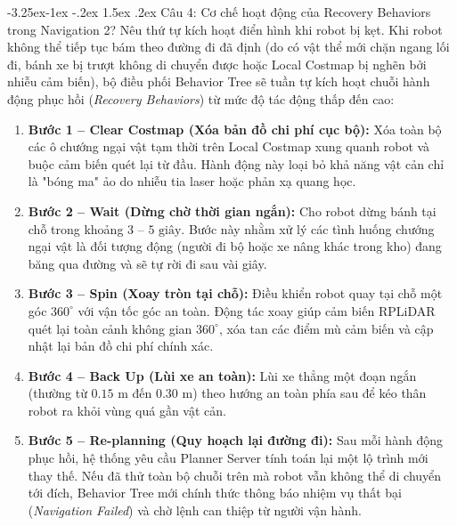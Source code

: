 \documentclass[11pt,a4paper]{article}
\makeatletter
\renewcommand{\subsection}{\@startsection{subsection}{2}{\z@}%
  {-3.25ex\@plus -1ex \@minus -.2ex}%
  {1.5ex \@plus .2ex}%
  {\normalfont\large\bfseries\color{secondary}}}
\makeatother
\begin{document}
\subsection{Câu 4: Cơ chế hoạt động của Recovery Behaviors trong Navigation 2? Nêu thứ tự kích hoạt điển hình khi robot bị kẹt.}
Khi robot không thể tiếp tục bám theo đường đi đã định (do có vật thể mới chặn ngang lối đi, bánh xe bị trượt không di chuyển được hoặc Local Costmap bị nghẽn bởi nhiễu cảm biến), bộ điều phối Behavior Tree sẽ tuần tự kích hoạt chuỗi hành động phục hồi (\textit{Recovery Behaviors}) từ mức độ tác động thấp đến cao:
\begin{enumerate}
  \item \textbf{Bước 1 -- Clear Costmap (Xóa bản đồ chi phí cục bộ):} Xóa toàn bộ các ô chướng ngại vật tạm thời trên Local Costmap xung quanh robot và buộc cảm biến quét lại từ đầu. Hành động này loại bỏ khả năng vật cản chỉ là "bóng ma" ảo do nhiễu tia laser hoặc phản xạ quang học.
  \item \textbf{Bước 2 -- Wait (Dừng chờ thời gian ngắn):} Cho robot dừng bánh tại chỗ trong khoảng $3\text{ -- }5\text{ giây}$. Bước này nhằm xử lý các tình huống chướng ngại vật là đối tượng động (người đi bộ hoặc xe nâng khác trong kho) đang băng qua đường và sẽ tự rời đi sau vài giây.
  \item \textbf{Bước 3 -- Spin (Xoay tròn tại chỗ):} Điều khiển robot quay tại chỗ một góc $360^\circ$ với vận tốc góc an toàn. Động tác xoay giúp cảm biến RPLiDAR quét lại toàn cảnh không gian $360^\circ$, xóa tan các điểm mù cảm biến và cập nhật lại bản đồ chi phí chính xác.
  \item \textbf{Bước 4 -- Back Up (Lùi xe an toàn):} Lùi xe thẳng một đoạn ngắn (thường từ $0.15\text{ m}$ đến $0.30\text{ m}$) theo hướng an toàn phía sau để kéo thân robot ra khỏi vùng quá gần vật cản.
  \item \textbf{Bước 5 -- Re-planning (Quy hoạch lại đường đi):} Sau mỗi hành động phục hồi, hệ thống yêu cầu Planner Server tính toán lại một lộ trình mới thay thế. Nếu đã thử toàn bộ chuỗi trên mà robot vẫn không thể di chuyển tới đích, Behavior Tree mới chính thức thông báo nhiệm vụ thất bại (\textit{Navigation Failed}) và chờ lệnh can thiệp từ người vận hành.
\end{enumerate}
\end{document}
